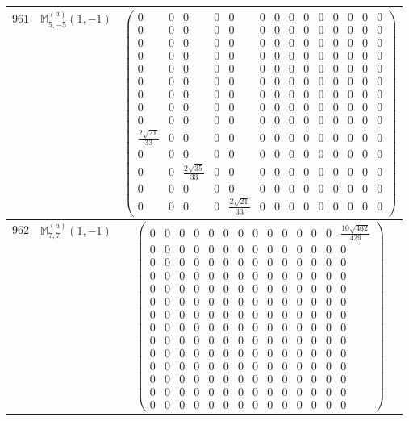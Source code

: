 \documentclass[fleqn,8pt,landscape]{jsarticle}
\begin{document}
\begin{center}
\begin{longtable}{ccc}
$ 961 $ & $ \mathbb{M}_{5,-5}^{(a)}(1,-1) $ & $ \begin{pmatrix} 0 & 0 & 0 & 0 & 0 & 0 & 0 & 0 & 0 & 0 & 0 & 0 & 0 & 0 \\ 0 & 0 & 0 & 0 & 0 & 0 & 0 & 0 & 0 & 0 & 0 & 0 & 0 & 0 \\ 0 & 0 & 0 & 0 & 0 & 0 & 0 & 0 & 0 & 0 & 0 & 0 & 0 & 0 \\ 0 & 0 & 0 & 0 & 0 & 0 & 0 & 0 & 0 & 0 & 0 & 0 & 0 & 0 \\ 0 & 0 & 0 & 0 & 0 & 0 & 0 & 0 & 0 & 0 & 0 & 0 & 0 & 0 \\ 0 & 0 & 0 & 0 & 0 & 0 & 0 & 0 & 0 & 0 & 0 & 0 & 0 & 0 \\ 0 & 0 & 0 & 0 & 0 & 0 & 0 & 0 & 0 & 0 & 0 & 0 & 0 & 0 \\ 0 & 0 & 0 & 0 & 0 & 0 & 0 & 0 & 0 & 0 & 0 & 0 & 0 & 0 \\ 0 & 0 & 0 & 0 & 0 & 0 & 0 & 0 & 0 & 0 & 0 & 0 & 0 & 0 \\ \frac{2 \sqrt{21}}{33} & 0 & 0 & 0 & 0 & 0 & 0 & 0 & 0 & 0 & 0 & 0 & 0 & 0 \\ 0 & 0 & 0 & 0 & 0 & 0 & 0 & 0 & 0 & 0 & 0 & 0 & 0 & 0 \\ 0 & 0 & \frac{2 \sqrt{35}}{33} & 0 & 0 & 0 & 0 & 0 & 0 & 0 & 0 & 0 & 0 & 0 \\ 0 & 0 & 0 & 0 & 0 & 0 & 0 & 0 & 0 & 0 & 0 & 0 & 0 & 0 \\ 0 & 0 & 0 & 0 & \frac{2 \sqrt{21}}{33} & 0 & 0 & 0 & 0 & 0 & 0 & 0 & 0 & 0 \end{pmatrix} $ \\ \hline
$ 962 $ & $ \mathbb{M}_{7,7}^{(a)}(1,-1) $ & $ \begin{pmatrix} 0 & 0 & 0 & 0 & 0 & 0 & 0 & 0 & 0 & 0 & 0 & 0 & 0 & \frac{10 \sqrt{462}}{429} \\ 0 & 0 & 0 & 0 & 0 & 0 & 0 & 0 & 0 & 0 & 0 & 0 & 0 & 0 \\ 0 & 0 & 0 & 0 & 0 & 0 & 0 & 0 & 0 & 0 & 0 & 0 & 0 & 0 \\ 0 & 0 & 0 & 0 & 0 & 0 & 0 & 0 & 0 & 0 & 0 & 0 & 0 & 0 \\ 0 & 0 & 0 & 0 & 0 & 0 & 0 & 0 & 0 & 0 & 0 & 0 & 0 & 0 \\ 0 & 0 & 0 & 0 & 0 & 0 & 0 & 0 & 0 & 0 & 0 & 0 & 0 & 0 \\ 0 & 0 & 0 & 0 & 0 & 0 & 0 & 0 & 0 & 0 & 0 & 0 & 0 & 0 \\ 0 & 0 & 0 & 0 & 0 & 0 & 0 & 0 & 0 & 0 & 0 & 0 & 0 & 0 \\ 0 & 0 & 0 & 0 & 0 & 0 & 0 & 0 & 0 & 0 & 0 & 0 & 0 & 0 \\ 0 & 0 & 0 & 0 & 0 & 0 & 0 & 0 & 0 & 0 & 0 & 0 & 0 & 0 \\ 0 & 0 & 0 & 0 & 0 & 0 & 0 & 0 & 0 & 0 & 0 & 0 & 0 & 0 \\ 0 & 0 & 0 & 0 & 0 & 0 & 0 & 0 & 0 & 0 & 0 & 0 & 0 & 0 \\ 0 & 0 & 0 & 0 & 0 & 0 & 0 & 0 & 0 & 0 & 0 & 0 & 0 & 0 \\ 0 & 0 & 0 & 0 & 0 & 0 & 0 & 0 & 0 & 0 & 0 & 0 & 0 & 0 \end{pmatrix} $ \\ \hline

\end{longtable}
\end{center}
\end{document}
